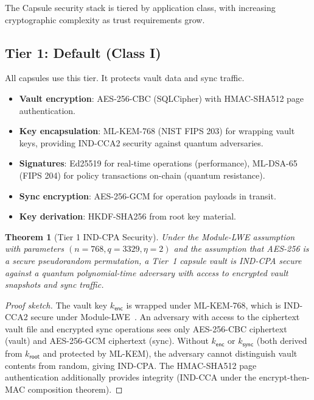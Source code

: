 \documentclass[11pt,a4paper]{article}
\newtheorem{theorem}{Theorem}[section]
\begin{document}
The Capsule security stack is tiered by application class, with increasing
cryptographic complexity as trust requirements grow.

\subsection{Tier 1: Default (Class I)}

All capsules use this tier. It protects vault data and sync traffic.

\begin{itemize}[nosep]
  \item \textbf{Vault encryption}: AES-256-CBC (SQLCipher) with HMAC-SHA512
        page authentication.
  \item \textbf{Key encapsulation}: ML-KEM-768 (NIST FIPS 203) for wrapping
        vault keys, providing IND-CCA2 security against quantum adversaries.
  \item \textbf{Signatures}: Ed25519 for real-time operations (performance),
        ML-DSA-65 (FIPS 204) for policy transactions on-chain (quantum
        resistance).
  \item \textbf{Sync encryption}: AES-256-GCM for operation payloads in transit.
  \item \textbf{Key derivation}: HKDF-SHA256 from root key material.
\end{itemize}

\begin{theorem}[Tier 1 IND-CPA Security]\label{thm:tier1}
Under the Module-LWE assumption with parameters $(n=768, q=3329, \eta=2)$
and the assumption that AES-256 is a secure pseudorandom permutation, a
Tier~1 capsule vault is IND-CPA secure against a quantum polynomial-time
adversary with access to encrypted vault snapshots and sync traffic.
\end{theorem}

\begin{proof}[Proof sketch]
The vault key $k_{\mathsf{enc}}$ is wrapped under ML-KEM-768, which is
IND-CCA2 secure under Module-LWE~\cite{lux-pq-crypto}. An adversary with
access to the ciphertext vault file and encrypted sync operations sees only
AES-256-CBC ciphertext (vault) and AES-256-GCM ciphertext (sync). Without
$k_{\mathsf{enc}}$ or $k_{\mathsf{sync}}$ (both derived from $k_{\mathsf{root}}$
and protected by ML-KEM), the adversary cannot distinguish vault contents from
random, giving IND-CPA. The HMAC-SHA512 page authentication additionally provides
integrity (IND-CCA under the encrypt-then-MAC composition theorem).
\end{proof}
\end{document}
